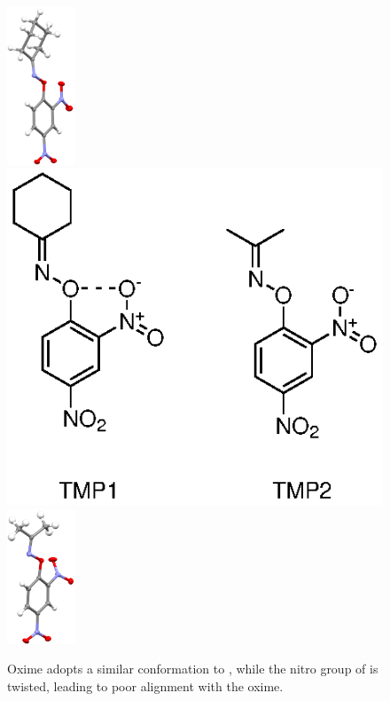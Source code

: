 \begin{refsection}
\begin{figure}
	\centering
	\includegraphics[width=2cm]{Figures/cyclohexanone-oxime-dnp-xray.pdf}
	\includegraphics[scale=0.74]{Figures/oximes.eps}
	\includegraphics[width=2cm]{Figures/acetone-oxime-dnp-xray.pdf}
	\caption[Oxime  adopts a similar conformation to .]{Oxime  adopts a similar conformation to , while the nitro group of  is twisted, leading to poor alignment with the oxime.}\label{fig:analogues}
\end{figure}


\end{refsection}
